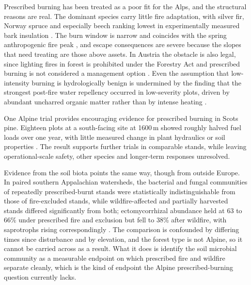 \documentclass[11pt,a4paper]{article}
\begin{document}
Prescribed burning has been treated as a poor fit for the Alps, and the structural reasons are real. The dominant species carry little fire adaptation, with silver fir, Norway spruce and especially beech ranking lowest in experimentally measured bark insulation \citep{mutterer_bark_2026, dupire_vulnerability_2019}. The burn window is narrow and coincides with the spring anthropogenic fire peak \citep{muller_forest_2020}, and escape consequences are severe because the slopes that need treating are those above assets. In Austria the obstacle is also legal, since lighting fires in forest is prohibited under the Forestry Act and prescribed burning is not considered a management option \citep{neumann_fuel_2022}. Even the assumption that low-intensity burning is hydrologically benign is undermined by the finding that the strongest post-fire water repellency occurred in low-severity plots, driven by abundant uncharred organic matter rather than by intense heating \citep{negri_wildfire_2026}.

One Alpine trial provides encouraging evidence for prescribed burning in Scots pine. Eighteen plots at a south-facing site at 1600\,m showed roughly halved fuel loads over one year, with little measured change in plant hydraulics or soil properties \citep{gamba_prescribed_2025}. The result supports further trials in comparable stands, while leaving operational-scale safety, other species and longer-term responses unresolved.

Evidence from the soil biota points the same way, though from outside Europe. In paired southern Appalachian watersheds, the bacterial and fungal communities of repeatedly prescribed-burnt stands were statistically indistinguishable from those of fire-excluded stands, while wildfire-affected and partially harvested stands differed significantly from both; ectomycorrhizal abundance held at 63 to 66\% under prescribed fire and exclusion but fell to 38\% after wildfire, with saprotrophs rising correspondingly \citep{snyder_taxonomic_2026}. The comparison is confounded by differing times since disturbance and by elevation, and the forest type is not Alpine, so it cannot be carried across as a result. What it does is identify the soil microbial community as a measurable endpoint on which prescribed fire and wildfire separate cleanly, which is the kind of endpoint the Alpine prescribed-burning question currently lacks.
\end{document}
